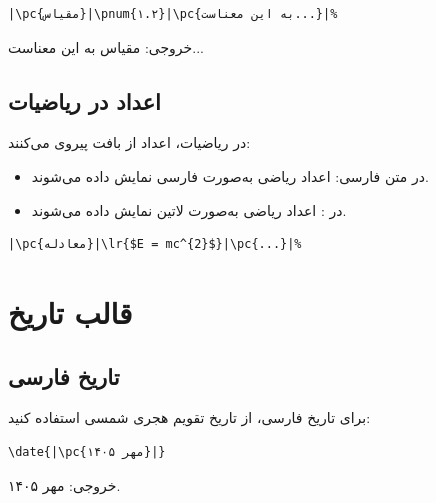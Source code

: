 \begin{latin}
\begin{verbatim}
|\pc{مقیاس}|\pnum{۱.۲}|\pc{به این معناست...}|%
\end{verbatim}
\end{latin}

خروجی: مقیاس  به این معناست...


\subsection{اعداد در ریاضیات}
\label{sec:localization-numbers-math}

در ریاضیات، اعداد از بافت پیروی می‌کنند:

\begin{itemize}
    \item در متن فارسی: اعداد ریاضی به‌صورت
    فارسی نمایش داده می‌شوند.
    \item در : اعداد ریاضی به‌صورت
    لاتین نمایش داده می‌شوند.
\end{itemize}

\begin{latin}
\begin{verbatim}
|\pc{معادله}|\lr{$E = mc^{2}$}|\pc{...}|%
\end{verbatim}
\end{latin}


\section{قالب تاریخ}
\label{sec:localization-dates}

\subsection{تاریخ فارسی}
\label{sec:localization-dates-fa}

برای تاریخ فارسی، از تاریخ تقویم هجری
شمسی استفاده کنید:

\begin{latin}
\begin{verbatim}
\date{|\pc{مهر ۱۴۰۵}|}
\end{verbatim}
\end{latin}

خروجی: مهر ۱۴۰۵.

